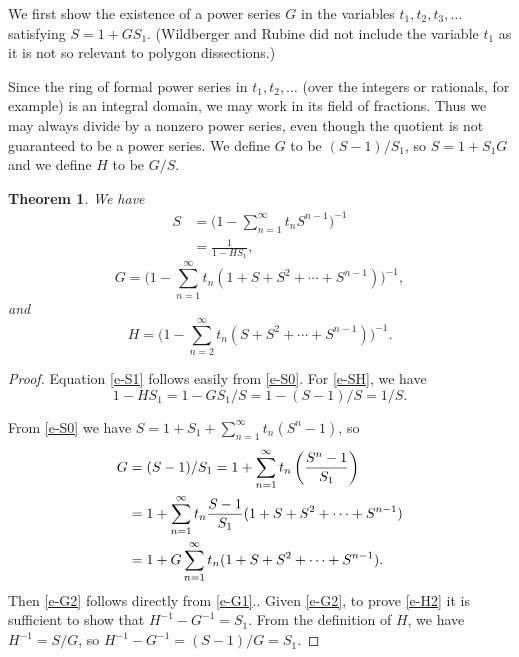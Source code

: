 \documentclass[12pt,reqno, oneside]{amsart}
\newtheorem{thm}{Theorem}[section]
\begin{document}
We first show the existence of a power series $G$ in the variables $t_1,t_2, t_3, \dots$ satisfying $S = 1+GS_1$. 
(Wildberger and Rubine did not include the variable $t_1$ as it is not so relevant to polygon dissections.)




Since the ring of formal power series in $t_1,t_2,\dots$ (over the integers or rationals, for example) is an integral domain, we may work in its field of fractions. Thus we may always divide by a nonzero power series, even though the quotient is not guaranteed to be a power series.
We  define $G$ to be $(S-1)/S_1$, so $S=1+S_1G$ and we define $H$ to be $G/S$. 

\begin{thm}
\label{t-1}
We have
\begin{align}
S &= \biggl(1-\sum_{n=1}^{\infty} t_nS^{n-1}\biggr)^{-1}\label{e-S1}\\
  &= \frac{1}{1-H S_1}, \label{e-SH}
\end{align}
\begin{equation}
G=\biggl(1-\sum_{n=1}^\infty t_n (1+S+S^2+\cdots+S^{n-1})\biggr)^{-1},\label{e-G2}
\end{equation}
and 
\begin{equation}
\label{e-H2}
H=\biggl( 1-\sum_{n=2}^\infty t_n (S+S^2+\cdots+S^{n-1})\biggr)^{-1}.
\end{equation}
\end{thm}

\begin{proof}
Equation \eqref{e-S1} follows easily from \eqref{e-S0}. For \eqref{e-SH}, we have
\begin{equation*}
1-HS_1 = 1-G S_1/S = 1-(S-1)/S =1/S.
\end{equation*}




From \eqref{e-S0}
we have
$S =1+ S_1 + \sum_{n=1}^\infty t_n (S^n-1)$, so
\begin{align}
G&=(S-1)/S_1=
 1+\sum_{n=1}^\infty t_n \left(\frac{S^n-1}{S_1}\right)\notag\\
&=1+\sum_{n=1}^\infty t_n \frac{S-1}{S_1}(1+S+S^2+\cdots+S^{n-1})\notag\\
&= 1+G\sum_{n=1}^\infty t_n (1+S+S^2+\cdots+S^{n-1}).\label{e-G1}
\end{align}
Then \eqref{e-G2} follows directly from \eqref{e-G1}..
Given \eqref{e-G2}, to prove \eqref{e-H2} it is sufficient to show that 
$H^{-1}-G^{-1}=S_1$. From the definition of $H$,
 we have  $H^{-1}=S/G$, so $H^{-1}-G^{-1}=(S-1)/G = S_1$.
 \end{proof}
 
\end{document}
